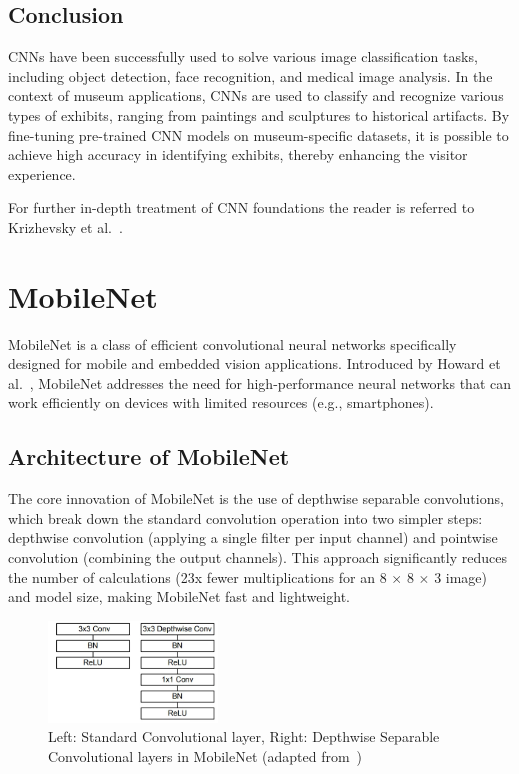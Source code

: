 \subsection{Conclusion}

CNNs have been successfully used to solve various image classification tasks, including object detection, face recognition, and medical image analysis. In the context of museum applications, CNNs are used to classify and recognize various types of exhibits, ranging from paintings and sculptures to historical artifacts. By fine-tuning pre-trained CNN models on museum-specific datasets, it is possible to achieve high accuracy in identifying exhibits, thereby enhancing the visitor experience.

For further in-depth treatment of CNN foundations the reader is referred to Krizhevsky et al.~\cite{krizhevsky_imagenet}.

\section{MobileNet}\label{section:mobilenet}

MobileNet is a class of efficient convolutional neural networks specifically designed for mobile and embedded vision applications. Introduced by Howard et al.~\cite{howard_mobilenet}, MobileNet addresses the need for high-performance neural networks that can work efficiently on devices with limited resources (e.g., smartphones).

\subsection{Architecture of MobileNet}

The core innovation of MobileNet is the use of depthwise separable convolutions, which break down the standard convolution operation into two simpler steps: depthwise convolution (applying a single filter per input channel) and pointwise convolution (combining the output channels). This approach significantly reduces the number of calculations (23x fewer multiplications for an 8 $\times$ 8 $\times$ 3 image) and model size, making MobileNet fast and lightweight.

\begin{figure}[h]
    \centering
    \includegraphics[width=0.4\textwidth]{img/mobilenet.png}
    \caption{Left: Standard Convolutional layer, Right: Depthwise Separable Convolutional layers in MobileNet (adapted from~\cite{howard_mobilenet})}\label{fig:mobilenet}
\end{figure}


